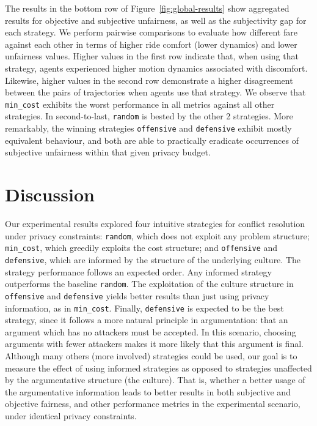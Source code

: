 \documentclass[acmsmall]{custom-arxiv}  %
\begin{document}
The results in the bottom row of Figure~\ref{fig:global-results} show aggregated results for objective and subjective unfairness, as well as the subjectivity gap for each strategy. We perform pairwise comparisons to evaluate how different fare against each other in terms of higher ride comfort (lower dynamics) and lower unfairness values. Higher values in the first row indicate that, when using that strategy, agents experienced higher motion dynamics associated with discomfort. Likewise, higher values in the second row demonstrate a higher disagreement between the pairs of trajectories when agents use that strategy. We observe that \texttt{min\_cost} exhibits the worst performance in all metrics against all other strategies. In second-to-last, \texttt{random} is bested by the other 2 strategies. More remarkably, the winning strategies \texttt{offensive} and \texttt{defensive} exhibit mostly equivalent behaviour, and both are able to practically eradicate occurrences of subjective unfairness within that given privacy budget.


\section{Discussion}

Our experimental results explored four intuitive strategies for conflict resolution under privacy constraints: \texttt{random}, which does not exploit any problem structure; \texttt{min\_cost}, which greedily exploits the cost structure; and \texttt{offensive} and \texttt{defensive}, which are informed by the structure of the underlying culture. The strategy performance follows an expected order. Any informed strategy outperforms the baseline \texttt{random}. The exploitation of the culture structure in \texttt{offensive} and \texttt{defensive} yields better results than just using privacy information, as in \texttt{min\_cost}. Finally, \texttt{defensive} is expected to be the best strategy, since it follows a more natural principle in argumentation: that an argument which has no attackers must be accepted. In this scenario, choosing arguments with fewer attackers makes it more likely that this argument is final. Although many others (more involved) strategies could be used, our goal is to measure the effect of using informed strategies as opposed to strategies unaffected by the argumentative structure (the culture). That is, whether a better usage of the argumentative information leads to better results in both subjective and objective fairness, and other performance metrics in the experimental scenario, under identical privacy constraints.
\end{document}
